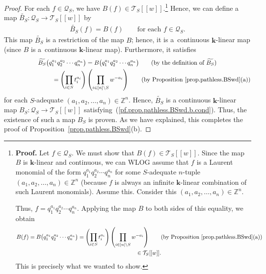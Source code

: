 \begin{proof}
For each $f\in\mathcal{Q}_{S}$, we have $B(f) \in\mathcal{T}_{S}[[w]] $.\footnote{\textbf{Proof.} Let $f\in\mathcal{Q}_{S}$. We must show that $B(f) \in \mathcal{T}_{S}[[w]] $. Since the map $B$ is $\mathbf{k}$-linear and continuous, we can WLOG assume that $f$ is a Laurent monomial of the form $q_{1}^{a_{1}}q_{2}^{a_{2}}\cdots q_{n}^{a_{n}}$ for some $S$-adequate $n$-tuple $\left( a_{1},a_{2},\ldots,a_{n}\right) \in \mathbb{Z}^{n}$ (because $f$ is always an infinite $\mathbf{k}$-linear combination of such Laurent monomials). Assume this. Consider this $ (a_{1},a_{2},\ldots,a_{n}) \in\mathbb{Z}^{n}$.

Thus, $f=q_{1}^{a_{1}}q_{2}^{a_{2}}\cdots q_{n}^{a_{n}}$. Applying the map $B$ to both sides of this equality, we obtain
\begin{gather*}
B(f) =B\big( q_{1}^{a_{1}}q_{2}^{a_{2}}\cdots q_{n}^{a_{n}}\big) =\left( \prod_{i\in S}t_{i}^{a_{i}}\right) \left(\prod_{i\in[n] \setminus S}w^{-a_{i}}\right) \qquad ( \text{by Proposition \ref{prop.pathless.BSwd}(a)}) \\
\hphantom{B(f) =}{} \in\mathcal{T}_{S}[[w]] .
\end{gather*}
This is precisely what we wanted to show.} Hence, we can define a map $\widetilde{B_{S}}\colon \mathcal{Q}_{S}\rightarrow\mathcal{T}_{S} [ [w]] $ by
\begin{gather*}
\widetilde{B_{S}}(f) =B(f) \qquad \text{for each }f\in\mathcal{Q}_{S}.
\end{gather*}
This map $\widetilde{B_{S}}$ is a restriction of the map $B$; hence, it is a~continuous $\mathbf{k}$-linear map (since $B$ is a~continuous $\mathbf{k}$-linear map). Furthermore, it satisfies
\begin{gather*}
\widetilde{B_{S}}\big( q_{1}^{a_{1}}q_{2}^{a_{2}}\cdots q_{n}^{a_{n}}\big) =B\big( q_{1}^{a_{1}}q_{2}^{a_{2}}\cdots q_{n}^{a_{n}}\big)\qquad ( \text{by the definition of }\widetilde{B_{S}}) \\
\hphantom{\widetilde{B_{S}}\big( q_{1}^{a_{1}}q_{2}^{a_{2}}\cdots q_{n}^{a_{n}}\big)}{} =\left( \prod_{i\in S}t_{i}^{a_{i}}\right) \left( \prod_{i\in [n] \setminus S}w^{-a_{i}}\right) \qquad ( \text{by Proposition \ref{prop.pathless.BSwd}(a)})
\end{gather*}
for each $S$-adequate $ ( a_{1},a_{2},\ldots,a_{n} ) \in \mathbb{Z}^{n}$. Hence, $\widetilde{B_{S}}$ is a continuous $\mathbf{k}$-linear map $B_{S}\colon \mathcal{Q}_{S}\rightarrow\mathcal{T}_{S} [ [w]] $ satisfying~(\ref{pf.prop.pathless.BSwd.b.cond}). Thus, the existence of such a map $B_{S}$ is proven. As we have explained, this completes the proof of Proposition~\ref{prop.pathless.BSwd}(b).
\end{proof}

